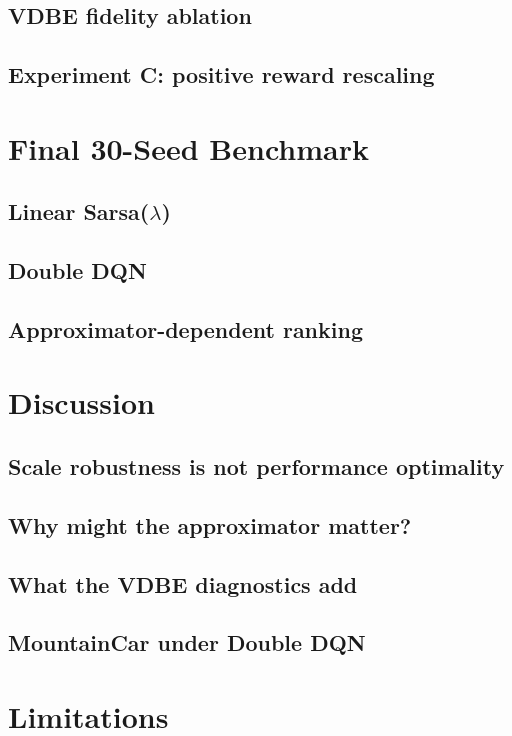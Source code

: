 \documentclass[preprint,12pt]{elsarticle}
\begin{document}
\subsection{VDBE fidelity ablation}

\subsection{Experiment C: positive reward rescaling}


\section{Final 30-Seed Benchmark}
\subsection{Linear Sarsa($\lambda$)}

\subsection{Double DQN}


\subsection{Approximator-dependent ranking}


\section{Discussion}
\subsection{Scale robustness is not performance optimality}

\subsection{Why might the approximator matter?}


\subsection{What the VDBE diagnostics add}


\subsection{MountainCar under Double DQN}

\section{Limitations}
\end{document}
